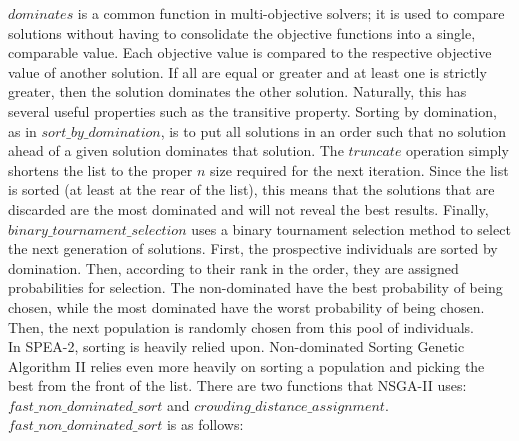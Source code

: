 \documentclass{article}
\begin{document}
    \(dominates\) is a common function in multi-objective solvers; it is used to compare solutions without having to consolidate the objective functions
    into a single, comparable value. Each objective value is compared to the respective objective value of another solution. If all are equal or greater and 
    at least one is strictly greater, then the solution dominates the other solution. Naturally, this has several useful properties such as the transitive 
    property. Sorting by domination, as in \(sort\_by\_domination\), is to put all solutions in an order such that no solution ahead of a given solution dominates 
    that solution. The \(truncate\) operation simply shortens the list to the proper \(n\) size required for the next iteration. Since the list is sorted (at 
    least at the rear of the list), this means that the solutions that are discarded are the most dominated and will not reveal the best results. Finally, 
    \(binary\_tournament\_selection\) uses a binary tournament selection method to select the next generation of solutions. First, the prospective individuals
    are sorted by domination. Then, according to their rank in the order, they are assigned probabilities for selection. The non-dominated have the best 
    probability of being chosen, while the most dominated have the worst probability of being chosen. Then, the next population is randomly chosen from this 
    pool of individuals. \cite{ZitzlerLaumannsThiele} \cite{KaucicMoradiMirzazadeh} \\
    In SPEA-2, sorting is heavily relied upon. Non-dominated Sorting Genetic Algorithm II relies even more heavily on sorting a population and picking the best from 
    the front of the list. There are two functions that NSGA-II uses: \(fast\_non\_dominated\_sort\) and \(crowding\_distance\_assignment\). \(fast\_non\_dominated\_sort\)
    is as follows:
\end{document}
